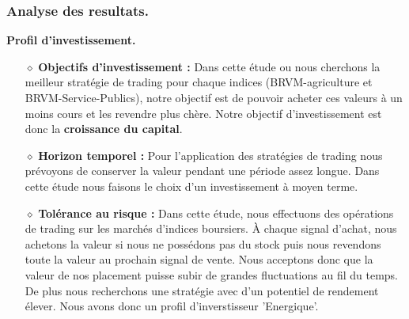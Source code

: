 \newpage
\subsubsection{Analyse des resultats.}

\textbf{Profil d'investissement.}
\begin{itemize}
    \item[$\diamond$] \textbf{Objectifs d'investissement : } 
    Dans cette étude ou nous cherchons la meilleur stratégie de trading pour chaque indices (BRVM-agriculture et 
    BRVM-Service-Publics), notre objectif est de pouvoir acheter ces valeurs à un moins cours et les revendre
    plus chère. Notre objectif d'investissement est donc la \textbf{croissance du capital}.
    
    \item[$\diamond$] \textbf{Horizon temporel : } 
    Pour l'application des stratégies de trading nous prévoyons de conserver la valeur 
    pendant une période assez longue. 
    Dans cette étude nous faisons le choix d'un investissement à moyen terme.

    \item[$\diamond$] \textbf{Tolérance au risque : } 
    Dans cette étude, nous effectuons des opérations de trading sur les marchés d'indices boursiers. 
    À chaque signal d'achat, nous achetons la valeur si nous ne possédons
    pas du stock puis nous revendons toute la valeur au prochain signal de vente. Nous acceptons donc
    que la valeur de nos placement puisse subir de grandes fluctuations au fil du temps. De plus nous 
    recherchons une stratégie avec d'un potentiel de rendement élever. 
    Nous avons donc un profil d'inverstisseur 'Energique'.
\end{itemize}

